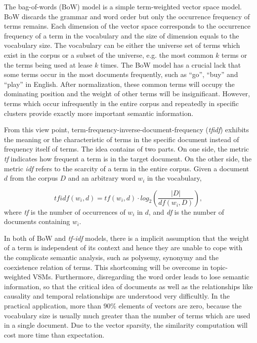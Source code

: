 The bag-of-words (BoW) model is a simple term-weighted vector space model. BoW discards the grammar and word order but only the occurrence frequency of terms remains. Each dimension of the vector space corresponds to the occurrence frequency of a term in the vocabulary and the size of dimension equals to the vocabulary size. The vocabulary can be either the universe set of terms which exist in the corpus or a subset of the universe, e.g. the most common $k$ terms or the terms being used at lease $k$ times. The BoW model has a crucial lack that some terms occur in the most documents frequently, such as ``go'', ``buy'' and ``play'' in English. After normalization, these common terms will occupy the dominating position and the weight of other terms will be insignificant. However, terms which occur infrequently in the entire corpus and repeatedly in specific clusters provide exactly more important semantic information. 

From this view point, term-frequency-inverse-document-frequency (\textit{tfidf}) exhibits the meaning or the characteristic of terms in the specific document instead of frequency itself of terms. The idea contains of two parts. On one side, the metric \textit{tf} indicates how frequent a term is in the target document. On the other side, the metric \textit{idf} refers to the scarcity of a term in the entire corpus. Given a document $d$ from the corpus $D$ and an arbitrary word $w_i$ in the vocabulary, 

\begin{equation}
    tfidf(w_i, d) = tf(w_i, d) \cdot log_2(\frac{|D|}{df(w_i, D)}), 
\end{equation}
where \textit{tf} is the number of occurrences of $w_i$ in $d$, and \textit{df} is the number of documents containing $w_i$. 

In both of BoW and \textit{tf-idf} models, there is a implicit assumption that the weight of a term is independent of its context and hence they are unable to cope with the complicate semantic analysis, such as polysemy, synonymy and the coexistence relation of terms. This shortcoming will be overcome in topic-weighted VSMs. Furthermore, disregarding the word order leads to lose semantic information, so that the critical idea of documents as well as the relationships like causality and temporal relationships are understood very difficultly. In the practical application, more than $90\%$ elements of vectors are zero, because the vocabulary size is usually much greater than the number of terms which are used in a single document. Due to the vector sparsity, the similarity computation will cost more time than expectation. 


